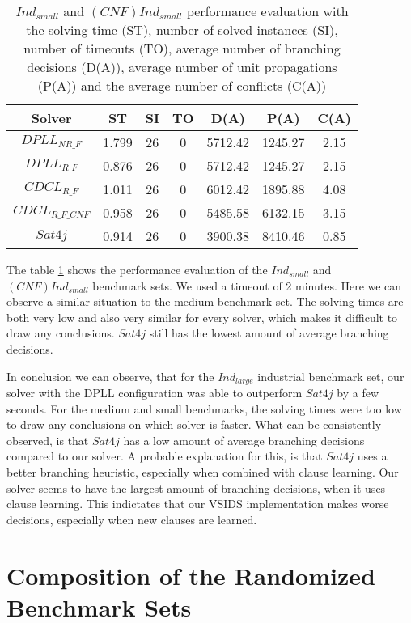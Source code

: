 \begin{table}[!htb]
\centering
\caption[$Ind_{small}$ and $(CNF)Ind_{small}$ performance evaluation]{$Ind_{small}$ and $(CNF)Ind_{small}$ performance evaluation with the solving time (ST), number of solved instances (SI), number of timeouts (TO), average number of branching decisions (D(A)), average number of unit propagations (P(A)) and the average number of conflicts (C(A))}
\label{tab:wBenchmarks}
\begin{tabular}{|c|c|c|c|c|c|c|}
\hline
Solver & ST & SI & TO & D(A) & P(A) & C(A)\\ 
\hline
$DPLL_{NR\_F}$ & 1.799 & 26 & 0 & 5712.42 & 1245.27 & 2.15 \\ 
\hline
$DPLL_{R\_F}$ & 0.876 & 26 & 0 & 5712.42 & 1245.27 & 2.15 \\ 
\hline
$CDCL_{R\_F}$ & 1.011 & 26 & 0 & 6012.42 & 1895.88 & 4.08 \\ 
\hline
$CDCL_{R\_F\_CNF}$ & 0.958 & 26 & 0 & 5485.58 & 6132.15 & 3.15 \\ 
\hline
$Sat4j$ & 0.914 & 26 & 0 & 3900.38 & 8410.46 & 0.85 \\ 
\hline
\end{tabular}
\end{table}

The table \ref{tab:wBenchmarks} shows the performance evaluation of the $Ind_{small}$ and  $(CNF)Ind_{small}$ benchmark sets. We used a timeout of 2 minutes. Here we can observe a similar situation to the medium benchmark set. The solving times are both very low and also very similar for every solver, which makes it difficult to draw any conclusions. $Sat4j$ still has the lowest amount of average branching decisions.

In conclusion we can observe, that for the $Ind_{large}$ industrial benchmark set, our solver with the DPLL configuration was able to outperform $Sat4j$ by a few seconds. For the medium and small benchmarks, the solving times were too low to draw any conclusions on which solver is faster. What can be consistently observed, is that $Sat4j$ has a low amount of average branching decisions compared to our solver. A probable explanation for this, is that $Sat4j$ uses a better branching heuristic, especially when combined with clause learning. Our solver seems to have the largest amount of branching decisions, when it uses clause learning. This indictates that our VSIDS implementation makes worse decisions, especially when new clauses are learned.

\section{Composition of the Randomized Benchmark Sets}

